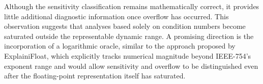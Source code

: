 Although the sensitivity classification remains mathematically correct, it provides little additional diagnostic information once overflow has occurred. This observation suggests that analyses based solely on condition numbers become saturated outside the representable dynamic range. A promising direction is the incorporation of a logarithmic oracle, similar to the approach proposed by ExplainiFloat, which explicitly tracks numerical magnitude beyond IEEE-754's exponent range and would allow sensitivity and overflow to be distinguished even after the floating-point representation itself has saturated.